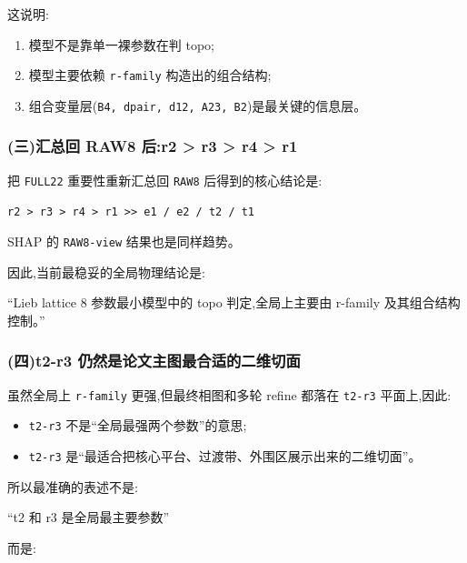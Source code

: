 \documentclass[lang=cn,scheme=chinese,color=blue,device=normal,toc=onecol,math=cm]{elegantbook}
\begin{document}
这说明:\par


\begin{enumerate}
\item 模型不是靠单一裸参数在判 topo;
\item 模型主要依赖 \texttt{r-family} 构造出的组合结构;
\item 组合变量层(\texttt{B4, dpair, d12, A23, B2})是最关键的信息层。
\end{enumerate}


\subsubsection{(三)汇总回 RAW8 后:r2 > r3 > r4 > r1}


把 \texttt{FULL22} 重要性重新汇总回 \texttt{RAW8} 后得到的核心结论是:\par


\texttt{r2 > r3 > r4 > r1 >> e1 /\allowbreak{} e2 /\allowbreak{} t2 /\allowbreak{} t1}\par


SHAP 的 \texttt{RAW8-view} 结果也是同样趋势。\par


因此,当前最稳妥的全局物理结论是:\par


“Lieb lattice 8 参数最小模型中的 topo 判定,全局上主要由 r-family 及其组合结构控制。”\par


\subsubsection{(四)t2-r3 仍然是论文主图最合适的二维切面}


虽然全局上 \texttt{r-family} 更强,但最终相图和多轮 refine 都落在 \texttt{t2-r3} 平面上,因此:\par


\begin{itemize}
\item \texttt{t2-r3} 不是“全局最强两个参数”的意思;
\item \texttt{t2-r3} 是“最适合把核心平台、过渡带、外围区展示出来的二维切面”。
\end{itemize}


所以最准确的表述不是:\par


“t2 和 r3 是全局最主要参数”\par


而是:\par
\end{document}
